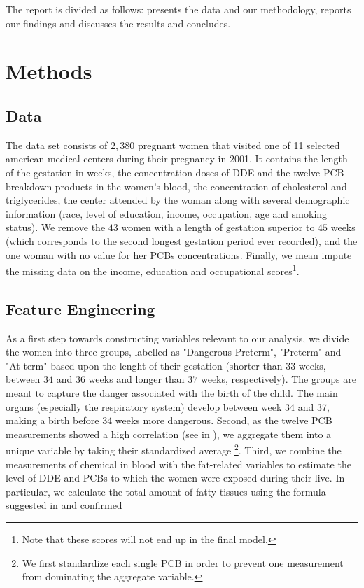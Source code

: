 \documentclass[10pt]{jmlr}%
\begin{document}
The report is divided as follows:  presents the data and our methodology,   reports our findings and  discusses the results and concludes.


\section{Methods}
\label{sec:method}

\subsection{Data}
\label{sec:data}
The data set consists of $2,380$ pregnant women that visited one of 11 selected american medical centers during their pregnancy in 2001. It contains the length of the gestation in weeks, the concentration doses of DDE and the twelve PCB breakdown products in the women's blood, the concentration of cholesterol and triglycerides, the center attended by the woman along with several demographic information (race, level of education, income, occupation, age and smoking status). We remove the $43$ women with a length of gestation superior to $45$ weeks (which corresponds to the second longest gestation period ever recorded), and the one woman with no value for her PCBs concentrations. Finally, we mean impute the missing data on the income, education and occupational scores\footnote{Note that these scores will not end up in the final model.}. 

\subsection{Feature Engineering}
\label{sec:feature}
As a first step towards constructing variables relevant to our analysis, we divide the women into three groups, labelled as "Dangerous Preterm", "Preterm" and "At term" based upon the lenght of their gestation (shorter than $33$ weeks, between $34$ and $36$ weeks and longer than $37$ weeks, respectively). The groups are meant to capture the danger associated with the birth of the child. The main organs (especially the respiratory system) develop between week 34 and 37, making a birth before 34 weeks more dangerous. Second, as the twelve PCB measurements showed a high correlation (see  in ), we aggregate them into a unique variable by taking their standardized average \footnote{We first standardize each single PCB in order to prevent one measurement from dominating the aggregate variable.}. Third, we combine the measurements of chemical in blood with the fat-related variables to estimate the level of DDE and PCBs to which the women were exposed during their live. In particular, we calculate the total amount of fatty tissues using the formula suggested in \cite{Phillips1989} and confirmed \cite{Bernert2007}
\end{document}
